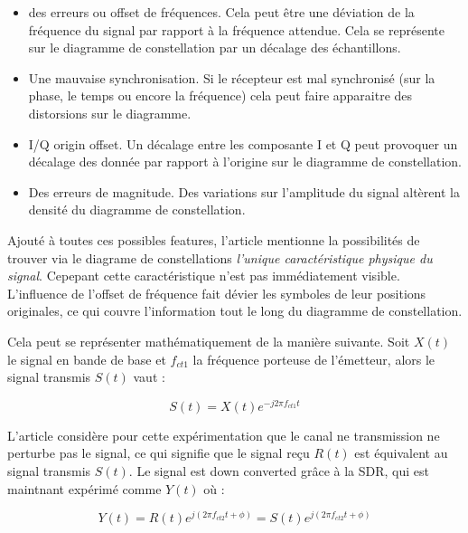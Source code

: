 \begin{itemize}
\item des erreurs ou offset de fréquences. Cela peut être une déviation de la fréquence du signal par rapport à la fréquence attendue. Cela se représente sur le diagramme de constellation par un décalage des échantillons. 
\item Une mauvaise synchronisation. Si le récepteur est mal synchronisé (sur la phase, le temps ou encore la fréquence) cela peut faire apparaitre des distorsions sur le diagramme.
\item I/Q origin offset. Un décalage entre les composante I et Q peut provoquer un décalage des donnée par rapport à l'origine sur le diagramme de constellation.
\item Des erreurs de magnitude. Des variations sur l'amplitude du signal altèrent la densité du diagramme de constellation.
\end{itemize}

\vspace{0.1cm}

Ajouté à toutes ces possibles features, l'article mentionne la possibilités de trouver via le diagrame de constellations \textit{l'unique caractéristique physique du signal}. Cepepant cette caractéristique n'est pas immédiatement visible. L'influence de l'offset de fréquence fait dévier les symboles de leur positions originales, ce qui couvre l'information tout le long du diagramme de constellation.

\vspace{0.1cm}

Cela peut se représenter mathématiquement de la manière suivante. Soit $X(t)$ le signal en bande de base et $f_{ct1}$ la fréquence porteuse de l'émetteur, alors le signal transmis $S(t)$ vaut :

\begin{equation}\label{eq4000}
	S(t) = X(t) e^{-j2\pi f_{ct1} t}
\end{equation} 

L'article considère pour cette expérimentation que le canal ne transmission ne perturbe pas le signal, ce qui signifie que le signal reçu $R(t)$ est équivalent au signal transmis $S(t)$. Le signal est down converted grâce à la SDR, qui est maintnant expérimé comme $Y(t)$ où :

\begin{equation}\label{eq4001}
	Y(t) = R(t) e^{j(2\pi f_{ct2} t + \phi)} = S(t) e^{j(2\pi f_{ct2} t + \phi)}
\end{equation} 

